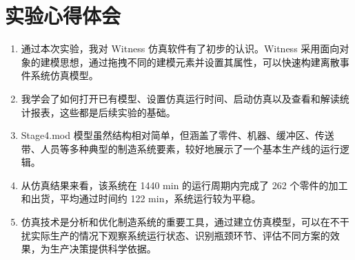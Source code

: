 \documentclass[12pt, a4paper, UTF8]{ctexart}
\begin{document}
\section{实验心得体会}
\begin{enumerate}
    \item 通过本次实验，我对 Witness 仿真软件有了初步的认识。Witness 采用面向对象的建模思想，通过拖拽不同的建模元素并设置其属性，可以快速构建离散事件系统仿真模型。
    \item 我学会了如何打开已有模型、设置仿真运行时间、启动仿真以及查看和解读统计报表，这些都是后续实验的基础。
    \item Stage4.mod 模型虽然结构相对简单，但涵盖了零件、机器、缓冲区、传送带、人员等多种典型的制造系统要素，较好地展示了一个基本生产线的运行逻辑。
    \item 从仿真结果来看，该系统在 1440 min 的运行周期内完成了 262 个零件的加工和出货，平均通过时间约 122 min，系统运行较为平稳。
    \item 仿真技术是分析和优化制造系统的重要工具，通过建立仿真模型，可以在不干扰实际生产的情况下观察系统运行状态、识别瓶颈环节、评估不同方案的效果，为生产决策提供科学依据。
\end{enumerate}
\end{document}
